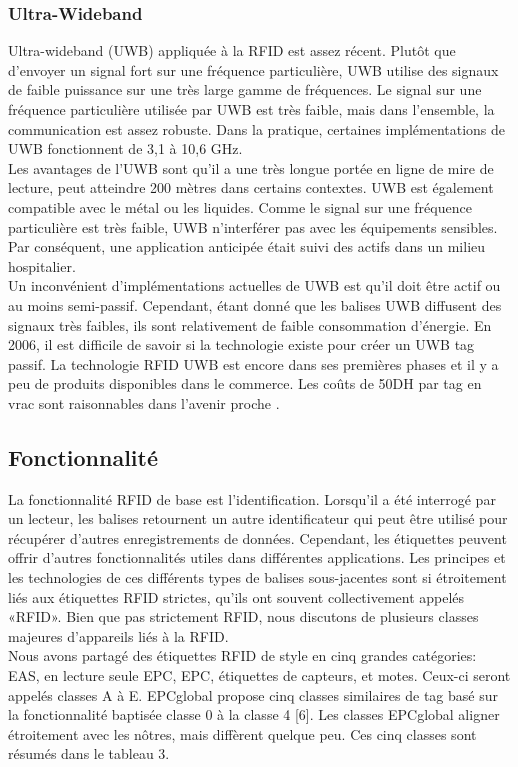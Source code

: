 \documentclass[11pt, a4paper, twoside]{book}
\begin{document}
\subsubsection{Ultra-Wideband}
Ultra-wideband (UWB) appliquée à la RFID est assez récent. Plutôt que d'envoyer un signal fort sur une fréquence particulière, UWB utilise des signaux de faible puissance sur une très large gamme de fréquences. Le signal sur une fréquence particulière utilisée par UWB est très faible, mais dans l'ensemble, la communication est assez robuste. Dans la pratique, certaines implémentations de UWB fonctionnent de 3,1 à 10,6 GHz.\\

Les avantages de l'UWB sont qu'il a une très longue portée en ligne de mire de lecture, peut atteindre 200 mètres dans certains contextes. UWB est également compatible avec le métal ou les liquides. Comme le signal sur une fréquence particulière est très faible, UWB n'interférer pas avec les équipements sensibles. Par conséquent, une application anticipée était suivi des actifs dans un milieu hospitalier.\\

Un inconvénient d'implémentations actuelles de UWB est qu'il doit être actif ou au moins semi-passif. Cependant, étant donné que les balises UWB diffusent des signaux très faibles, ils sont relativement de faible consommation d'énergie. En 2006, il est difficile de savoir si la technologie existe pour créer un UWB tag passif.
La technologie RFID UWB est encore dans ses premières phases et il y a peu de produits disponibles dans le commerce. Les coûts de 50DH par tag en vrac sont raisonnables dans l'avenir proche .
\subsection{Fonctionnalité}
La fonctionnalité RFID de base est l'identification. Lorsqu'il a été interrogé par un lecteur, les balises retournent un autre identificateur qui peut être utilisé pour récupérer d'autres enregistrements de données. Cependant, les étiquettes peuvent offrir d'autres fonctionnalités utiles dans différentes applications. Les principes et les technologies de ces différents types de balises sous-jacentes sont si étroitement liés aux étiquettes RFID strictes, qu'ils ont souvent collectivement appelés «RFID». Bien que pas strictement RFID, nous discutons de plusieurs classes majeures d'appareils liés à la RFID.\\

Nous avons partagé des étiquettes RFID de style en cinq grandes catégories: EAS, en lecture seule EPC, EPC, étiquettes de capteurs, et motes. Ceux-ci seront appelés classes A à E. EPCglobal propose cinq classes similaires de tag basé sur la fonctionnalité baptisée classe 0 à la classe 4 [6]. Les classes EPCglobal aligner étroitement avec les nôtres, mais diffèrent quelque peu. Ces cinq classes sont résumés dans le tableau 3.
\end{document}
